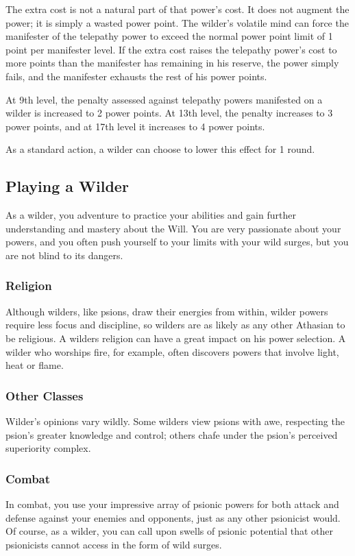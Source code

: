 The extra cost is not a natural part of that power's cost. It does not augment the power; it is simply a wasted power point. The wilder's volatile mind can force the manifester of the telepathy power to exceed the normal power point limit of 1 point per manifester level. If the extra cost raises the telepathy power's cost to more points than the manifester has remaining in his reserve, the power simply fails, and the manifester exhausts the rest of his power points.

At 9th level, the penalty assessed against telepathy powers manifested on a wilder is increased to 2 power points. At 13th level, the penalty increases to 3 power points, and at 17th level it increases to 4 power points.

As a standard action, a wilder can choose to lower this effect for 1 round.

\subsection{Playing a Wilder}
As a wilder, you adventure to practice your abilities and gain further understanding and mastery about the Will. You are very passionate about your powers, and you often push yourself to your limits with your wild surges, but you are not blind to its dangers.

\subsubsection{Religion}
Although wilders, like psions, draw their energies from within, wilder powers require less focus and discipline, so wilders are as likely as any other Athasian to be religious. A wilders religion can have a great impact on his power selection. A wilder who worships fire, for example, often discovers powers that involve light, heat or flame.

\subsubsection{Other Classes}
Wilder's opinions vary wildly. Some wilders view psions with awe, respecting the psion's greater knowledge and control; others chafe under the psion's perceived superiority complex.

\subsubsection{Combat}
In combat, you use your impressive array of psionic powers for both attack and defense against your enemies and opponents, just as any other psionicist would. Of course, as a wilder, you can call upon swells of psionic potential that other psionicists cannot access in the form of wild surges.


